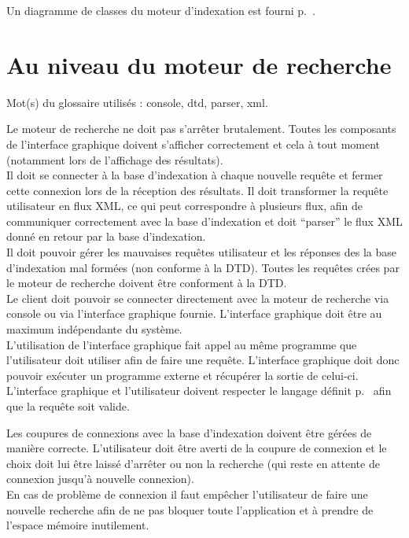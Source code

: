 Un diagramme de classes du moteur d'indexation est fourni p.~\pageref{diagramme_classes_mi}.

\section{Au niveau du moteur de recherche}
Mot(s) du glossaire utilisés : \gls{console}, \gls{dtd}, \gls{parser}, \gls{xml}.

Le moteur de recherche ne doit pas s'arrêter brutalement. Toutes les composants de l'interface graphique doivent s'afficher correctement et cela à tout moment (notamment lors de l'affichage des résultats).\\
Il doit se connecter à la base d'indexation à chaque nouvelle requête et fermer cette connexion lors de la réception des résultats. Il doit transformer la requête utilisateur en flux XML, ce qui peut correspondre à plusieurs flux, afin de communiquer correctement avec la base d'indexation et doit \enquote{parser} le flux XML donné  en retour par la base d'indexation.\\
Il doit pouvoir gérer les mauvaises requêtes utilisateur et les réponses des la base d'indexation mal formées (non conforme à la DTD). Toutes les requêtes crées par le moteur de recherche doivent être conforment à la DTD.\\
Le client doit pouvoir se connecter directement avec la moteur de recherche via console ou via l'interface graphique fournie. L'interface graphique doit être au maximum indépendante du système.\\
L'utilisation de l'interface graphique fait appel au même programme que l'utilisateur doit utiliser afin de faire une requête. L'interface graphique doit donc pouvoir exécuter un programme externe et récupérer la sortie de celui-ci. L'interface graphique et l'utilisateur doivent respecter le langage définit p.~\pageref{langage_req} afin que la requête soit valide.

Les coupures de connexions avec la base d'indexation doivent être gérées de manière correcte. L'utilisateur doit être averti de la coupure de connexion et le choix doit lui être laissé d'arrêter ou non la recherche (qui reste en attente de connexion jusqu'à nouvelle connexion).\\
En cas de problème de connexion il faut empêcher l'utilisateur de faire une nouvelle recherche afin de ne pas bloquer toute l'application et à prendre de l'espace mémoire inutilement.

